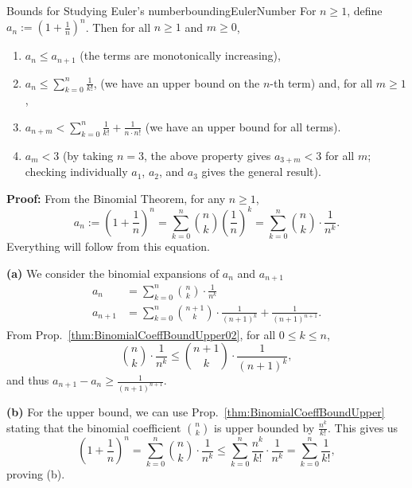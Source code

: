 \begin{propColor}{Bounds for Studying Euler's number}{boundingEulerNumber}
  For $n \ge 1$, define $a_n:=\left(1 + \frac{1}{n}  \right)^n$. Then for all $n \ge 1$ and $m\ge 0$, 
  \begin{enumerate}
  \renewcommand{\labelenumi}{(\alph{enumi})}
\setlength{\itemsep}{.2cm}
      \item $a_{n} \le a_{n+1}$ (the terms are monotonically increasing), 
      \item $a_n \le  \sum_{k=0}^{n} \frac{1}{k!}$, (we have an upper bound on the $n$-th term) and, for all $m \ge 1$, 
      \item $a_{n+m} < \sum_{k=0}^{n} \frac{1}{k!} + \frac{1}{n \cdot n!}$ (we have an upper bound for all terms).
      \item $a_m < 3$ (by taking $n=3$, the above property gives $a_{3+m} < 3$ for all $m$; checking individually $a_1$, $a_2$, and $a_3$ gives the general result).
  \end{enumerate}
\end{propColor}

\textbf{Proof:} From the Binomial Theorem,  for any $n \geq 1$,
\begin{equation}
\label{eq:binomialAn}
   a_n:=\left( 1 + \frac{1}{n} \right)^n = \sum_{k=0}^{n} \binom{n}{k} \left( \frac{1}{n} \right)^k =  \sum_{k=0}^{n} \binom{n}{k} \cdot \frac{1}{n^k}  .
\end{equation}
Everything will follow from this equation. 


\textbf{(a)} We consider the binomial expansions of $a_n$ and $a_{n+1}$
\begin{align*}
    a_n& = \sum_{k=0}^{n} \binom{n}{k} \cdot \frac{1}{n^k} \\
    a_{n+1}&=  \sum_{k=0}^{n} \binom{n+1}{k}\cdot \frac{1}{(n+1)^k} + \frac{1}{(n+1)^{n+1}}.
\end{align*}
From Prop.~\ref{thm:BinomialCoeffBoundUpper02}, for all $0 \le k \le n$,
$$\binom{n}{k} \cdot \frac{1}{n^k} \le  \binom{n+1}{k}\cdot \frac{1}{(n+1)^k},$$
and thus $a_{n+1}- a_n \ge \frac{1}{(n+1)^{n+1}}$.

  
 \textbf{(b)} For the upper bound, we can use Prop.~\ref{thm:BinomialCoeffBoundUpper} stating that the binomial coefficient $\binom{n}{k}$ is upper bounded by $\frac{n^k}{k!}$. This gives us
\begin{equation}
\left( 1 + \frac{1}{n} \right)^n = \sum_{k=0}^{n} \binom{n}{k} \cdot \frac{1}{n^k}  \leq \sum_{k=0}^{n} \frac{n^k}{k!} \cdot \frac{1}{n^k} = \sum_{k=0}^{n} \frac{1}{k!},
\end{equation}
proving (b). \\

